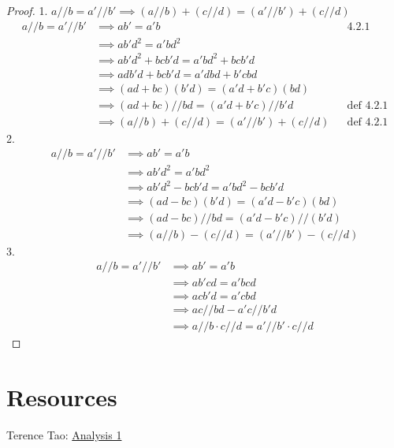 \documentclass[answers,12pt]{exam}
\begin{document}
\begin{solution}
\begin{proof}
    1. $a//b=a'//b' \implies (a//b)+(c//d) = (a'//b')+(c//d)$
    \begin{align*}
        a//b = a'//b' &\implies ab' = a'b && \text{4.2.1} \\
        &\implies ab'd^2 = a'bd^2 \\
        &\implies ab'd^2 + bcb'd = a'bd^2 + bcb'd \\
        &\implies adb'd + bcb'd = a'dbd + b'cbd \\
        &\implies (ad+bc)(b'd) = (a'd + b'c)(bd) \\
        &\implies (ad + bc) // bd = (a'd + b'c)//b'd && \text{def 4.2.1}\\
        &\implies (a//b) + (c//d) = (a'//b')+(c//d) && \text{def 4.2.1}
    \end{align*}
    2. 
    \begin{align*}
        a//b = a'//b' &\implies ab' = a'b \\
        &\implies ab'd^2=a'bd^2 \\
        &\implies ab'd^2-bcb'd=a'bd^2-bcb'd \\
        &\implies (ad-bc)(b'd) = (a'd-b'c)(bd) \\
        &\implies (ad-bc)//bd = (a'd-b'c)//(b'd)\\
        &\implies (a//b)-(c//d)=(a'//b')-(c//d)
    \end{align*}
    3.
    \begin{align*}
        a//b=a'//b' &\implies ab'=a'b \\
        &\implies ab'cd=a'bcd \\
        &\implies acb'd=a'cbd \\
        &\implies ac//bd-a'c//b'd \\
        &\implies a//b \cdot c//d = a'//b' \cdot c//d
    \end{align*}
\end{proof}
\end{solution}



\section{Resources}
Terence Tao: \href{https://terrytao.wordpress.com/books/analysis-i/}{Analysis 1}
\end{document}
